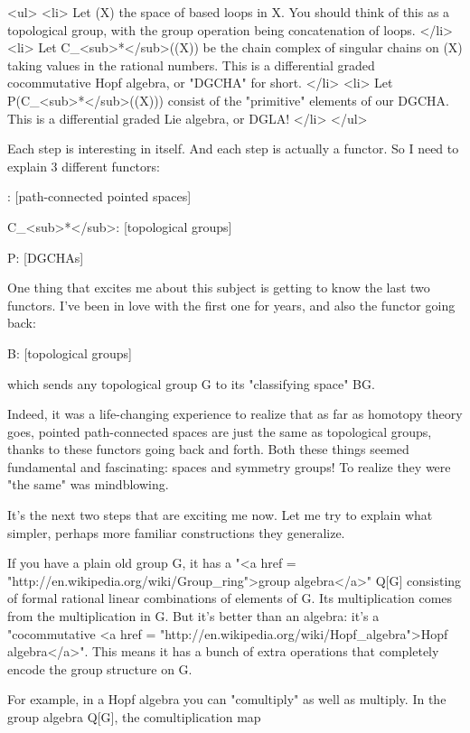 <ul>
<li>
 Let \Omega (X) the space of based loops in X.  You should think 
 of this as a topological group, with the group operation being 
 concatenation of loops.  
</li>
<li>
 Let C_{<sub>*}</sub>(\Omega (X)) be the chain complex of
 singular chains on \Omega (X) taking values in the rational numbers.
 This is a differential graded cocommutative Hopf algebra, or
 "DGCHA" for short.
</li>
<li>
 Let P(C_{<sub>*}</sub>(\Omega (X))) consist of the
 "primitive" elements of our DGCHA.  This is a differential
 graded Lie algebra, or DGLA!  
</li> 
</ul>

Each step is interesting in itself.  And each step is actually a
functor.  So I need to explain 3 different functors:

\Omega : [path-connected pointed spaces] 

C_{<sub>*}</sub>: [topological groups] \to  [DGCHAs]

P: [DGCHAs] \to  [DGLAs]

One thing that excites me about this subject is getting to know the
last two functors.  I've been in love with the first one for years,
and also the functor going back:

B: [topological groups] 

which sends any topological group G to its "classifying space" BG.

Indeed, it was a life-changing experience to realize that as far as
homotopy theory goes, pointed path-connected spaces are just the same
as topological groups, thanks to these functors going back and forth.
Both these things seemed fundamental and fascinating: spaces and
symmetry groups!  To realize they were "the same" was mindblowing.

It's the next two steps that are exciting me now.  Let me try to
explain what simpler, perhaps more familiar constructions they
generalize.

If you have a plain old group G, it has a "<a href =
"http://en.wikipedia.org/wiki/Group_ring">group algebra</a>" Q[G]
consisting of formal rational linear combinations of elements of G.
Its multiplication comes from the multiplication in G.  But it's
better than an algebra: it's a "cocommutative <a href =
"http://en.wikipedia.org/wiki/Hopf_algebra">Hopf algebra</a>".
This means it has a bunch of extra operations that completely encode
the group structure on G.

For example, in a Hopf algebra you can "comultiply" as well
as multiply.  In the group algebra Q[G], the comultiplication map

